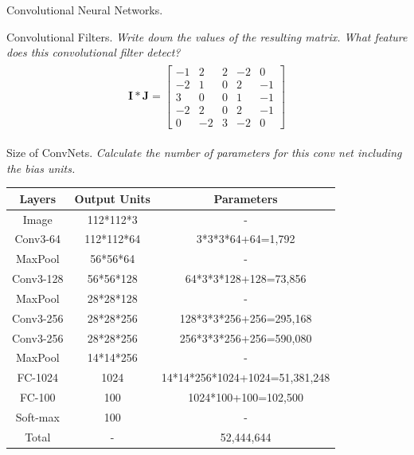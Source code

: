 \documentclass{myhw}
\begin{document}
\begin{homeworkProblem}
Convolutional Neural Networks.
\begin{homeworkSection}
Convolutional Filters. \emph{Write down the values of the resulting matrix. What feature does this convolutional filter detect?} 
\begin{gather*}
\begin{aligned}
\textbf{I} * \textbf{J} = \begin{bmatrix}
-1 & 2 & 2 & -2 & 0\\
-2 & 1 & 0 & 2 & -1\\
3 & 0 & 0 & 1 & -1\\
-2 & 2 & 0 & 2 & -1\\
0 & -2 & 3 & -2 & 0
\end{bmatrix}
\end{aligned}
\end{gather*}
\end{homeworkSection}
\begin{homeworkSection}
Size of ConvNets. \emph{Calculate the number of parameters for this conv net including the bias units.} \\ 
\begin{center}
\begin{tabular}[h]{ |c|c|c| } 
\hline
Layers & Output Units & Parameters \\
\hline
Image & 112*112*3 & - \\
Conv3-64 & 112*112*64 & 3*3*3*64+64=1,792 \\
MaxPool & 56*56*64 & - \\
Conv3-128 & 56*56*128 & 64*3*3*128+128=73,856 \\
MaxPool & 28*28*128 & - \\
Conv3-256 & 28*28*256 & 128*3*3*256+256=295,168 \\
Conv3-256 & 28*28*256 & 256*3*3*256+256=590,080 \\
MaxPool & 14*14*256 & - \\
FC-1024 & 1024 & 14*14*256*1024+1024=51,381,248 \\
FC-100 & 100 & 1024*100+100=102,500 \\
Soft-max & 100 & - \\
\hline
Total & - & 52,444,644 \\
\hline
\end{tabular}
\end{center}
\end{homeworkSection}
\end{homeworkProblem}
\end{document}
